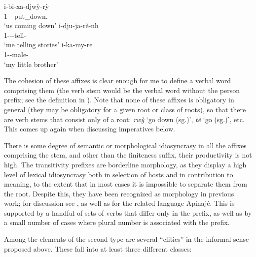 \documentclass[output=paper]{langscibook}
\begin{document}
\ea
    \ea\gll i-bi-xa-djwỳ-rỳ\\
        1-\Antic-\Tra-put\_down.\Pl-\Nfin{}\\
      \glt `us coming down'
    \ex\gll i-dju-ja-rẽ-nh\\
        1-\Antip-\Tr-tell-\Nfin\\
      \glt `me telling stories'
    \ex\label{dim}\gll i-ka-my-re\\
        1-\Rela-male-\Dim\\
      \glt `my little brother'
    \z
\z

The cohesion of these affixes is clear enough for me to define a verbal word comprising them (the verb stem would be the verbal word without the person prefix; see the definition in ). Note that none of these affixes is obligatory in general (they may be obligatory for a given root or class of roots), so that there are verb stems that consist only of a root: {\em rwỳ} `go down (sg.)', {\em tẽ} `go (sg.)', etc. This comes up again when discussing imperatives below.

There is some degree of semantic or morphological idiosyncrasy in all the affixes comprising the stem, and other than the finiteness suffix, their productivity is not high. The transitivity prefixes are borderline morphology, as they display a high level of lexical idiosyncrasy both in selection of hosts and in contribution to meaning, to the extent that in most cases it is impossible to separate them from the root. Despite this, they have been recognized as morphology in previous work; for discussion see \citet{salanova:redup}, as well as \citet[116--128]{oliveira:phd} for the related language Apinajé. This is supported by a handful of sets of verbs that differ only in the prefix, as well as by a small number of cases where plural number is associated with the prefix.

Among the elements of the second type are several ``clitics'' in the informal sense proposed above. These fall into at least three different classes: %
\end{document}
